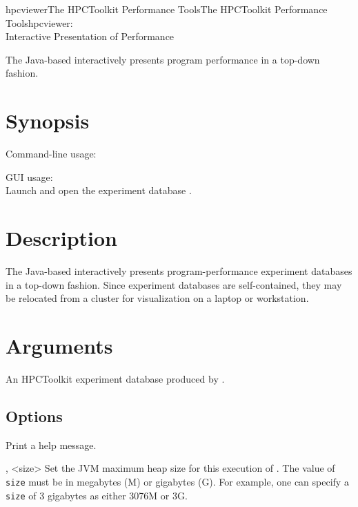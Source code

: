 \documentclass[english]{article}
\begin{document}
\begin{Name}{1}{hpcviewer}{The HPCToolkit Performance Tools}{The HPCToolkit Performance Tools}{hpcviewer:\\ Interactive Presentation of Performance}

The Java-based  interactively presents program performance in a top-down fashion.

\end{Name}

\section{Synopsis}

Command-line usage:\\
\SP\SP\SP{}  

GUI usage:\\
\SP\SP\SP Launch  and open the experiment database .


\section{Description}

The Java-based  interactively presents program-performance experiment databases
in a top-down fashion.
Since experiment databases are self-contained,
they may be relocated from a cluster for visualization on a laptop or workstation.

\section{Arguments}

\begin{Description}
\item[\Arg{hpctoolkit-database}] An HPCToolkit experiment database
produced by .
\end{Description}


\subsection{Options}

\begin{Description}

\item[\Opt{-h} \Opt{--help}]
Print a help message.


\item[\Opt{-jh}, \Opt{--java-heap} <size>]
  	Set the JVM maximum heap size for this execution of  . The value of \texttt{size} must be
	in megabytes (M) or gigabytes (G). For example, one can specify a \texttt{size}  of 3 gigabytes as either
	3076M or 3G.


\end{Description}
\end{document}
